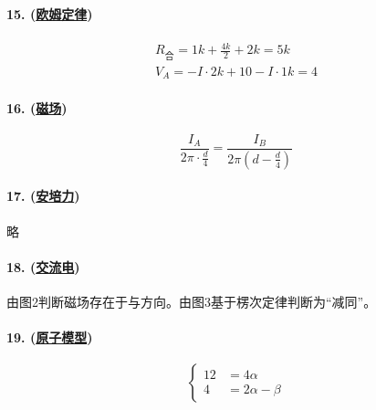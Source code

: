 \paragraph{15. (\hyperref[subsec:欧姆定律]{欧姆定律})}

\begin{gather*}
    R_\text{合}=1k+\frac{4k}{2}+2k=5k\\
    V_A=-I\cdot 2k+10-I\cdot 1k=4
\end{gather*}

\paragraph{16. (\hyperref[subsec:磁场]{磁场})}

\begin{equation*}
    \frac{I_A}{2\pi\cdot\frac{d}{4}}=\frac{I_B}{2\pi\left(d-\frac{d}{4}\right)}
\end{equation*}

\paragraph{17. (\hyperref[subsec:安培力]{安培力})} 略

\paragraph{18. (\hyperref[subsec:交流电]{交流电})} 由图2判断磁场存在于与方向。由图3基于楞次定律判断为“减同”。

\paragraph{19. (\hyperref[sec:原子模型]{原子模型})}

\begin{equation*}
    \begin{cases}
        12&=4\alpha\\
        4&=2\alpha-\beta
    \end{cases}
\end{equation*}
